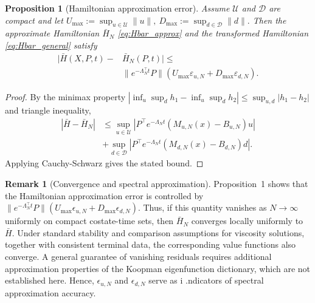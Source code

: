 \documentclass[letterpaper, 10 pt, conference]{ieeeconf}
\theoremstyle{plain}
\newtheorem{proposition}{Proposition}
\theoremstyle{definition}
\newtheorem{remark}{\textbf{Remark}}
\begin{document}
\begin{proposition}[Hamiltonian approximation error]\label{thm:propos1}
    Assume $\mathcal U$ and $\mathcal D$ are compact and let
    \(
    U_{\max}:=\sup_{u\in\mathcal U}\|u\|,
    \
    D_{\max}:=\sup_{d\in\mathcal D}\|d\|.
    \)
    Then the approximate Hamiltonian $\bar H_N$ \eqref{eq:Hbar_approx} and the transformed Hamiltonian \eqref{eq:Hbar_general} satisfy
    \begin{equation}
        \begin{aligned}
            |\bar H(X,P,t)-&\bar H_N(P,t)| \le \\
            &\|e^{-\Lambda_N^\top t}P\|
            \left(
            U_{\max}\varepsilon_{u,N}
            +
            D_{\max}\varepsilon_{d,N}
            \right).
        \end{aligned}
    \end{equation}
\end{proposition}
\begin{proof}
    By the minimax property $|\inf_u \sup_d h_1 - \inf_u \sup_d h_2| \le \sup_{u,d} |h_1 - h_2|$ and triangle inequality, 
    \begin{align*}
        |\bar H - \bar H_N| 
        &\le \sup_{u\in\mathcal U} \left| P^\top e^{-\Lambda_N t} (M_{u,N}(x) - B_{u,N})u \right| \\
        &+ \sup_{d\in\mathcal D} \left| P^\top e^{-\Lambda_N t} (M_{d,N}(x) - B_{d,N})d \right|.
    \end{align*}
    Applying Cauchy-Schwarz gives the stated bound.
\end{proof}


\begin{remark}[Convergence and spectral approximation]
    Proposition~1 shows that the Hamiltonian approximation error is controlled by $\|e^{-\Lambda_N^\top t}P\| (U_{\max}\epsilon_{u,N}+D_{\max}\epsilon_{d,N})$.
    Thus, if this quantity vanishes as $N\to\infty$ uniformly on compact costate-time sets, then $\bar H_N$ converges locally uniformly to $\bar H$. Under standard stability and comparison assumptions for viscosity solutions, together with consistent terminal data, the corresponding value functions also converge. 
    A general guarantee of vanishing residuals requires additional approximation properties of the Koopman eigenfunction dictionary, which are not established here. Hence, $\epsilon_{u,N}$ and $\epsilon_{d,N}$ serve as i
    .ndicators of spectral approximation accuracy.
\end{remark}
\end{document}

